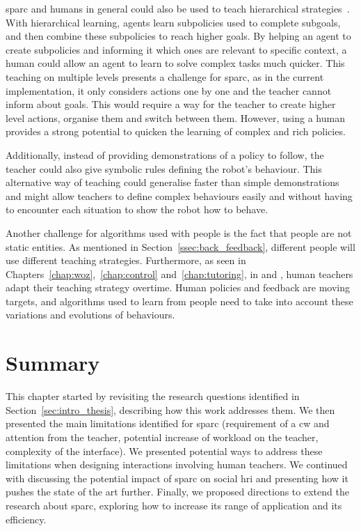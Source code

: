 \gls{sparc} and humans in general could also be used to teach hierarchical strategies~\citep{barto2003recent}. With hierarchical learning, agents learn subpolicies used to complete subgoals, and then combine these subpolicies to reach higher goals. By helping an agent to create subpolicies and informing it which ones are relevant to specific context, a human could allow an agent to learn to solve complex tasks much quicker. This teaching on multiple levels presents a challenge for \gls{sparc}, as in the current implementation, it only considers actions one by one and the teacher cannot inform about goals. This would require a way for the teacher to create higher level actions, organise them and switch between them. However, using a human provides a strong potential to quicken the learning of complex and rich policies.

Additionally, instead of providing demonstrations of a policy to follow, the teacher could also give symbolic rules defining the robot's behaviour. This alternative way of teaching could generalise faster than simple demonstrations and might allow teachers to define complex behaviours easily and without having to encounter each situation to show the robot how to behave. 

Another challenge for algorithms used with people is the fact that people are not static entities. As mentioned in Section~\ref{ssec:back_feedback}, different people will use different teaching strategies. Furthermore, as seen in Chapters~\ref{chap:woz},~\ref{chap:control} and~\ref{chap:tutoring}, in \cite{thomaz2008teachable} and \cite{macglashan2017interactive}, human teachers adapt their teaching strategy overtime. Human policies and feedback are moving targets, and algorithms used to learn from people need to take into account these variations and evolutions of behaviours.

\section{Summary} \label{sec:disc_summary}

This chapter started by revisiting the research questions identified in Section~\ref{sec:intro_thesis}, describing how this work addresses them. We then presented the main limitations identified for \gls{sparc} (requirement of a \gls{cw} and attention from the teacher, potential increase of workload on the teacher, complexity of the interface). We presented potential ways to address these limitations when designing interactions involving human teachers. We continued with discussing the potential impact of \gls{sparc} on social \gls{hri} and presenting how it pushes the state of the art further. Finally, we proposed directions to extend the research about \gls{sparc}, exploring how to increase its range of application and its efficiency.